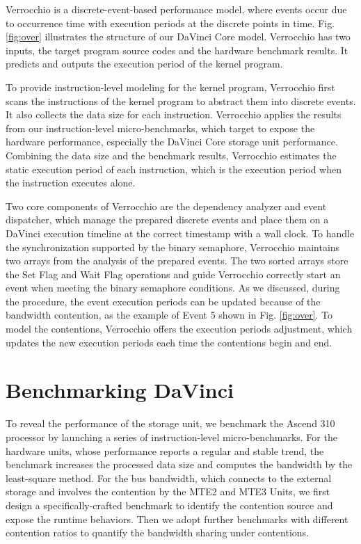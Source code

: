 \documentclass[12pt]{extbook}
\begin{document}
Verrocchio is a discrete-event-based performance model, where events occur due to occurrence time with execution periods at the discrete points in time. Fig. \ref{fig:over} illustrates the structure of our DaVinci Core model. Verrocchio has two inputs, the target program source codes and the hardware benchmark results. It predicts and outputs the execution period of the kernel program.

To provide instruction-level modeling for the kernel program, Verrocchio first scans the instructions of the kernel program to abstract them into discrete events. It also collects the data size for each instruction. Verrocchio applies the results from our instruction-level micro-benchmarks, which target to expose the hardware performance, especially the DaVinci Core storage unit performance. Combining the data size and the benchmark results, Verrocchio estimates the static execution period of each instruction, which is the execution period when the instruction executes alone.

Two core components of Verrocchio are the dependency analyzer and event dispatcher, which manage the prepared discrete events and place them on a DaVinci execution timeline at the correct timestamp with a wall clock. To handle the synchronization supported by the binary semaphore, Verrocchio maintains two arrays from the analysis of the prepared events. The two sorted arrays store the Set Flag and Wait Flag operations and guide Verrocchio correctly start an event when meeting the binary semaphore conditions. As we discussed, during the procedure, the event execution periods can be updated because of the bandwidth contention, as the example of Event 5 shown in Fig. \ref{fig:over}. To model the contentions, Verrocchio offers the execution periods adjustment, which updates the new execution periods each time the contentions begin and end.

\section{Benchmarking DaVinci}

To reveal the performance of the storage unit, we benchmark the Ascend 310 processor by launching a series of instruction-level micro-benchmarks. For the hardware units, whose performance reports a regular and stable trend, the benchmark increases the processed data size and computes the bandwidth by the least-square method. For the bus bandwidth, which connects to the external storage and involves the contention by the MTE2 and MTE3 Units, we first design a specifically-crafted benchmark to identify the contention source and expose the runtime behaviors. Then we adopt further benchmarks with different contention ratios to quantify the bandwidth sharing under contentions.
\end{document}
